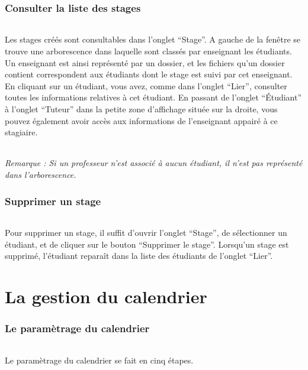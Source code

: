 \documentclass[a4paper,10pt]{book}
\begin{document}
    \section{Consulter la liste des stages}
      \paragraph{}
	Les stages créés sont consultables dans l'onglet ``Stage''.
	A gauche de la fenêtre se trouve une arborescence dans laquelle sont classés par enseignant les étudiants. 
	Un enseignant est ainsi représenté par un dossier, et les fichiers qu'un dossier contient correspondent aux étudiants dont le stage est suivi par cet enseignant.
	En cliquant sur un étudiant, vous avez, comme dans l'onglet ``Lier'', consulter toutes les informations relatives à cet étudiant. 
	En passant de l'onglet ``Étudiant'' à l'onglet ``Tuteur'' dans la petite zone d'affichage située sur la droite, vous pouvez également avoir accès aux informations de l'enseignant appairé à ce stagiaire.
	
	\paragraph{}
	  \textit{Remarque : Si un professeur n'est associé à aucun étudiant, il n'est pas représenté dans l'arborescence.}
      
    \section{Supprimer un stage}
      \paragraph{}
	Pour supprimer un stage, il suffit d'ouvrir l'onglet ``Stage'', de sélectionner un étudiant, et de cliquer sur le bouton ``Supprimer le stage''.
	Lorsqu'un stage est supprimé, l'étudiant reparaît dans la liste des étudiants de l'onglet ``Lier''.
    
    
\part{La gestion du calendrier}
  \setcounter{section}{0}
    \section{Le paramètrage du calendrier}
      \paragraph{}
	Le paramètrage du calendrier se fait en cinq étapes.
	
\end{document}
